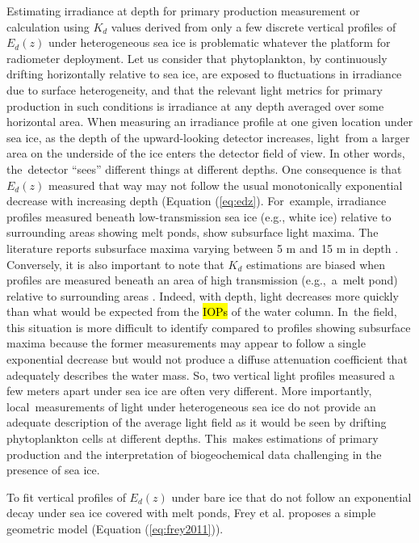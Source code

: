 \documentclass[applsci,article,accept,moreauthors,pdftex,10pt,a4paper]{Definitions/mdpi}
\newcommand{\ked}{\ensuremath{K_{d}}}
\newcommand{\edz}{\ensuremath{{E_d(z)}}}
\begin{document}
Estimating irradiance at depth for primary production measurement or calculation using \ked{} values derived from only a few discrete vertical profiles of \edz{} under heterogeneous sea ice is problematic whatever the platform for radiometer deployment. Let us consider that phytoplankton, by continuously drifting horizontally relative to sea ice, are exposed to fluctuations in irradiance due to surface heterogeneity, and that the relevant light metrics for primary production in such conditions is irradiance at any depth averaged over some horizontal area. When measuring an irradiance profile at one given location under sea ice, as the depth of the upward-looking detector increases, light~from a larger area on the underside of the ice enters the detector field of view. In other words, the~detector ``sees'' different things at different depths. One consequence is that \edz{} measured that way may not follow the usual monotonically exponential decrease with increasing depth (Equation (\ref{eq:edz}). For~example, irradiance profiles measured beneath low-transmission sea ice (e.g., white ice) relative to surrounding areas showing melt ponds, show subsurface light maxima. The literature reports subsurface maxima varying between 5 m and 15 m in depth \citep{Frey2011, Katlein2016, Laney2017}. Conversely, it is also important to note that \ked{} estimations are biased when profiles are measured beneath an area of high transmission (e.g.,~a~melt pond) relative to surrounding areas \citep{Katlein2016}. Indeed, with depth, light decreases more quickly than what would be expected from the \hl{IOPs} of the water column. In~the field, this situation is more difficult to identify compared to profiles showing subsurface maxima because the former measurements may appear to follow a single exponential decrease but would not produce a diffuse attenuation coefficient that adequately describes the water mass. So, two vertical light profiles measured a few meters apart under sea ice are often very different. More importantly, local~measurements of light under heterogeneous sea ice do not provide an adequate description of the average light field as it would be seen by drifting phytoplankton cells at different depths. This~makes estimations of primary production and the interpretation of biogeochemical data challenging in the presence of sea ice.

To fit vertical profiles of \edz{} under bare ice that do not follow an exponential decay under sea ice covered with melt ponds, Frey et al. \cite{Frey2011} proposes a simple geometric model (Equation (\ref{eq:frey2011})). 
\end{document}
